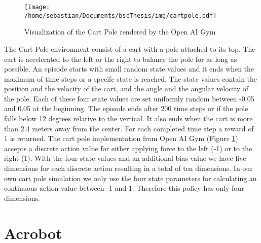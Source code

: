 
\begin{figure}[h]
    \texttt{[image: /home/sebastian/Documents/bscThesis/img/cartpole.pdf]}
    \caption{Visualization of the Cart Pole rendered by the Open AI Gym\label{fig:cartpolePygym}}
\end{figure}

The Cart Pole environment consist of a cart with a pole attached to its top. The cart is accelerated to the left or the right to balance the pole for as long as possible. An episode starts with small random state values and it ends when the maximum of time steps or a specifc state is reached. The state values contain the position and the velocity of the cart, and the angle and the angular velocity of the pole. Each of these four state values are set uniformly random between -0.05 and 0.05 at the beginning. The episode ends after 200 time steps or if the pole falls below 12 degrees relative to the vertical. It also ends when the cart is more than 2.4 meters away from the center. For each completed time step a reward of 1 is returned. The cart pole implementation from Open AI Gym (Figure \ref{fig:cartpolePygym}) accepts a discrete action value for either applying force to the left (-1) or to the right (1). With the four state values and an additional bias value we have five dimensions for each discrete action resulting in a total of ten dimensions. In our own cart pole simulation we only use the four state parameters for calculating an continuous action value between -1 and 1. Therefore this policy has only four dimensions.


\section{Acrobot}


